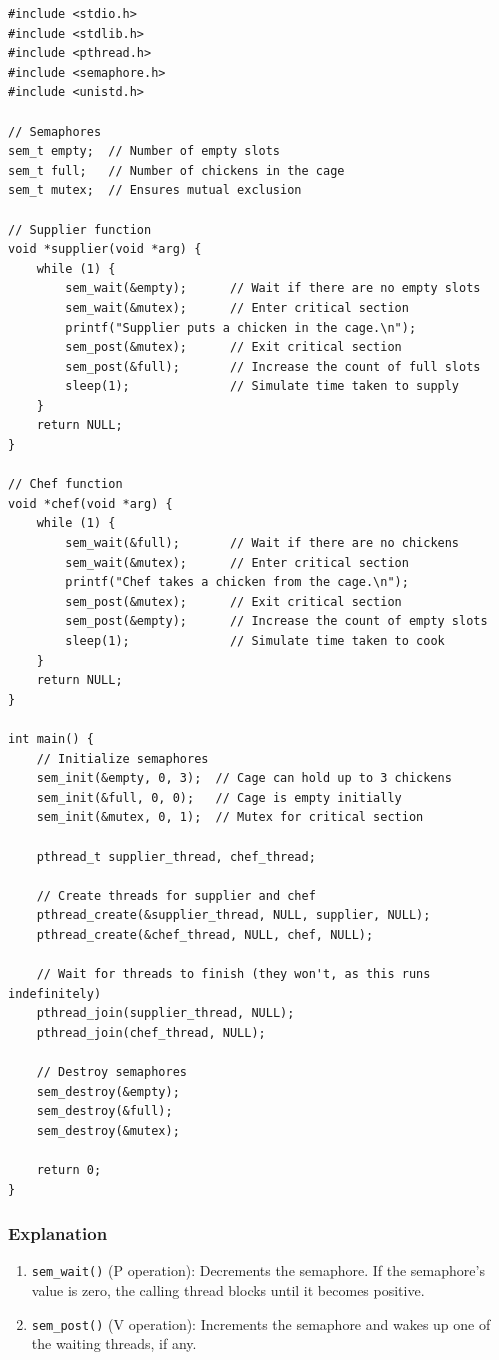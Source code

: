 \documentclass[a4paper]{book}
\begin{document}
\begin{verbatim}
#include <stdio.h>
#include <stdlib.h>
#include <pthread.h>
#include <semaphore.h>
#include <unistd.h>

// Semaphores
sem_t empty;  // Number of empty slots
sem_t full;   // Number of chickens in the cage
sem_t mutex;  // Ensures mutual exclusion

// Supplier function
void *supplier(void *arg) {
    while (1) {
        sem_wait(&empty);      // Wait if there are no empty slots
        sem_wait(&mutex);      // Enter critical section
        printf("Supplier puts a chicken in the cage.\n");
        sem_post(&mutex);      // Exit critical section
        sem_post(&full);       // Increase the count of full slots
        sleep(1);              // Simulate time taken to supply
    }
    return NULL;
}

// Chef function
void *chef(void *arg) {
    while (1) {
        sem_wait(&full);       // Wait if there are no chickens
        sem_wait(&mutex);      // Enter critical section
        printf("Chef takes a chicken from the cage.\n");
        sem_post(&mutex);      // Exit critical section
        sem_post(&empty);      // Increase the count of empty slots
        sleep(1);              // Simulate time taken to cook
    }
    return NULL;
}

int main() {
    // Initialize semaphores
    sem_init(&empty, 0, 3);  // Cage can hold up to 3 chickens
    sem_init(&full, 0, 0);   // Cage is empty initially
    sem_init(&mutex, 0, 1);  // Mutex for critical section

    pthread_t supplier_thread, chef_thread;

    // Create threads for supplier and chef
    pthread_create(&supplier_thread, NULL, supplier, NULL);
    pthread_create(&chef_thread, NULL, chef, NULL);

    // Wait for threads to finish (they won't, as this runs indefinitely)
    pthread_join(supplier_thread, NULL);
    pthread_join(chef_thread, NULL);

    // Destroy semaphores
    sem_destroy(&empty);
    sem_destroy(&full);
    sem_destroy(&mutex);

    return 0;
}
\end{verbatim}

\subsubsection{Explanation}
\begin{enumerate}
\item 
\verb|sem_wait()| (P operation): Decrements the semaphore. If the semaphore's value is zero, the calling thread blocks until it becomes positive.

\item 
\verb|sem_post()| (V operation): Increments the semaphore and wakes up one of the waiting threads, if any.

\end{enumerate}
\end{document}
